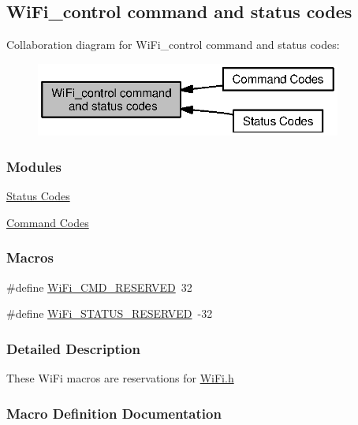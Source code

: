 \subsection{Wi\+Fi\+\_\+control command and status codes}
\label{group___wi_fi___c_o_n_t_r_o_l}
Collaboration diagram for Wi\+Fi\+\_\+control command and status codes\+:
\nopagebreak
\begin{figure}[H]
\begin{center}
\leavevmode
\includegraphics[width=285pt]{group___wi_fi___c_o_n_t_r_o_l}
\end{center}
\end{figure}
\subsubsection*{Modules}
\begin{DoxyCompactItemize}
\item 
\hyperlink{group___wi_fi___s_t_a_t_u_s}{Status Codes}
\item 
\hyperlink{group___wi_fi___c_m_d}{Command Codes}
\end{DoxyCompactItemize}
\subsubsection*{Macros}
\begin{DoxyCompactItemize}
\item 
\#define \hyperlink{group___wi_fi___c_o_n_t_r_o_l_ga1f193fb2e462cfbfe8d5648c7b766710}{Wi\+Fi\+\_\+\+C\+M\+D\+\_\+\+R\+E\+S\+E\+R\+V\+E\+D}~32
\item 
\#define \hyperlink{group___wi_fi___c_o_n_t_r_o_l_ga2c7d9d0bec5da43eb7cc442f2f155399}{Wi\+Fi\+\_\+\+S\+T\+A\+T\+U\+S\+\_\+\+R\+E\+S\+E\+R\+V\+E\+D}~-\/32
\end{DoxyCompactItemize}


\subsubsection{Detailed Description}
These Wi\+Fi macros are reservations for \hyperlink{_wi_fi_8h}{Wi\+Fi.\+h} 

\subsubsection{Macro Definition Documentation}
